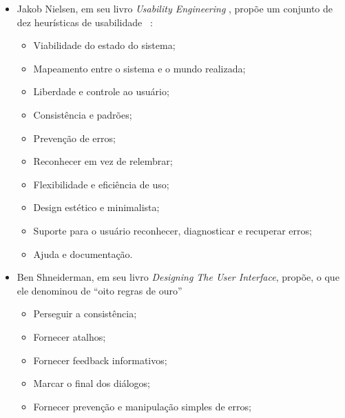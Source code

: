 \begin{itemize}
\item Jakob Nielsen, em seu livro \textit{Usability Engineering} , propõe um
conjunto de dez heurísticas de usabilidade ~\cite{nielsen1994}:

    \begin{itemize} 

    \item Viabilidade do estado do sistema;

    \item Mapeamento entre o sistema e o mundo realizada;

    \item Liberdade e controle ao usuário;

    \item Consistência e padrões;

    \item Prevenção de erros;

    \item Reconhecer em vez de relembrar;

    \item Flexibilidade e eficiência de uso;

    \item Design estético e minimalista;

    \item Suporte para o usuário reconhecer, diagnosticar e recuperar erros;

    \item Ajuda e documentação.

    \end{itemize}

\item Ben Shneiderman, em seu livro \textit{Designing The User Interface},
propõe, o que ele denominou de ``oito regras de ouro'' ~\cite{shneiderman2003}

    \begin{itemize} 

    \item Perseguir a consistência;

    \item Fornecer atalhos;

    \item Fornecer feedback informativos;

    \item Marcar o final dos diálogos;

    \item Fornecer prevenção e manipulação simples de erros;


\end{itemize}
\end{itemize}
